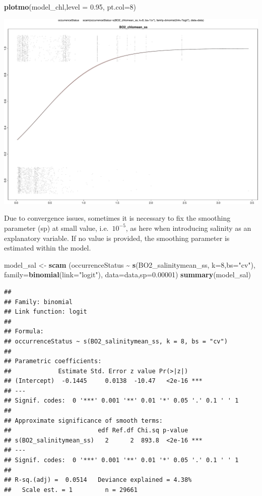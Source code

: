 \documentclass[
]{book}
\newenvironment{Shaded}{\begin{snugshade}}{\end{snugshade}}
\newcommand{\AttributeTok}[1]{\textcolor[rgb]{0.13,0.29,0.53}{#1}}
\newcommand{\DecValTok}[1]{\textcolor[rgb]{0.00,0.00,0.81}{#1}}
\newcommand{\FloatTok}[1]{\textcolor[rgb]{0.00,0.00,0.81}{#1}}
\newcommand{\FunctionTok}[1]{\textcolor[rgb]{0.13,0.29,0.53}{\textbf{#1}}}
\newcommand{\NormalTok}[1]{#1}
\newcommand{\OtherTok}[1]{\textcolor[rgb]{0.56,0.35,0.01}{#1}}
\newcommand{\SpecialCharTok}[1]{\textcolor[rgb]{0.81,0.36,0.00}{\textbf{#1}}}
\newcommand{\StringTok}[1]{\textcolor[rgb]{0.31,0.60,0.02}{#1}}
\begin{document}
\begin{Shaded}
\begin{Highlighting}[]
\FunctionTok{plotmo}\NormalTok{(model\_chl,}\AttributeTok{level =} \FloatTok{0.95}\NormalTok{, }\AttributeTok{pt.col=}\DecValTok{8}\NormalTok{)}
\end{Highlighting}
\end{Shaded}

\includegraphics{_main_files/figure-latex/unnamed-chunk-61-1.pdf}

Due to convergence issues, sometimes it is necessary to fix the smoothing parameter (sp) at small value, i.e.~\(10^{-5}\), as here when introducing salinity as an explanatory variable. If no value is provided, the smoothing parameter is estimated within the model.

\begin{Shaded}
\begin{Highlighting}[]
\NormalTok{model\_sal }\OtherTok{\textless{}{-}} \FunctionTok{scam}\NormalTok{ (occurrenceStatus }\SpecialCharTok{\textasciitilde{}}  \FunctionTok{s}\NormalTok{(BO2\_salinitymean\_ss, }\AttributeTok{k=}\DecValTok{8}\NormalTok{,}\AttributeTok{bs=}\StringTok{"cv"}\NormalTok{), }\AttributeTok{family=}\FunctionTok{binomial}\NormalTok{(}\AttributeTok{link=}\StringTok{"logit"}\NormalTok{), }\AttributeTok{data=}\NormalTok{data,}\AttributeTok{sp=}\FloatTok{0.00001}\NormalTok{)}
\FunctionTok{summary}\NormalTok{(model\_sal)}
\end{Highlighting}
\end{Shaded}

\begin{verbatim}
## 
## Family: binomial 
## Link function: logit 
## 
## Formula:
## occurrenceStatus ~ s(BO2_salinitymean_ss, k = 8, bs = "cv")
## 
## Parametric coefficients:
##             Estimate Std. Error z value Pr(>|z|)    
## (Intercept)  -0.1445     0.0138  -10.47   <2e-16 ***
## ---
## Signif. codes:  0 '***' 0.001 '**' 0.01 '*' 0.05 '.' 0.1 ' ' 1
## 
## Approximate significance of smooth terms:
##                        edf Ref.df Chi.sq p-value    
## s(BO2_salinitymean_ss)   2      2  893.8  <2e-16 ***
## ---
## Signif. codes:  0 '***' 0.001 '**' 0.01 '*' 0.05 '.' 0.1 ' ' 1
## 
## R-sq.(adj) =  0.0514   Deviance explained = 4.38%
##   Scale est. = 1         n = 29661
\end{verbatim}
\end{document}
